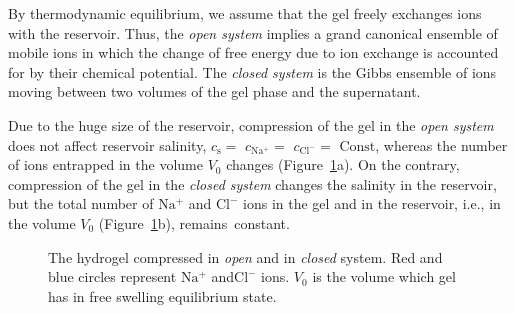 \documentclass[gels,article,accept,pdftex,moreauthors]{Definitions/mdpi}
\newcommand{\ie}{{i.e.,} }
\newcommand{\cna}{c_\mathrm{Na^+}}
\newcommand{\ccl}{c_\mathrm{Cl^-}}
\newcommand{\cl}{\mathrm{Cl^-}}
\newcommand{\na}{\mathrm{Na^+}}
\newcommand{\cs}{c_{\mathrm{s}}}
\newcommand{\Vbox}{V_0}
\newcommand{\reffig}[1]{Figure~\ref{#1}}
\begin{document}
By thermodynamic equilibrium, we assume that the gel freely exchanges ions with the reservoir.
Thus, the \emph{open system} implies a grand canonical ensemble of mobile ions in which the change of free energy due to ion exchange is accounted for by their chemical potential.
The \emph{closed system} is the Gibbs ensemble of ions moving between two volumes of the gel phase and the supernatant.

Due to the huge size of the reservoir, compression of the gel in the \emph{open system} does not affect reservoir salinity, $\cs =$ $\cna=$ $\ccl=$ $\text{Const}$, whereas the number of ions entrapped in the volume $\Vbox$ changes (\reffig{fig:open and closed}a).
On the contrary, compression of the gel in the \emph{closed system} changes the salinity in the reservoir, but the total number of $\na$ and $\cl$ ions in the gel and in the reservoir, \ie in the volume $\Vbox$ (\reffig{fig:open and closed}b), remains~constant.
\begin{figure}[H]
	{\captionsetup{position=bottom,justification=centering}
	}
	
	\caption{The hydrogel compressed in \emph{open} and in \emph{closed} system.
		Red and blue circles represent $\na$ and$\cl$ ions. $V_0$ is the volume which gel has in free swelling equilibrium state.\label{fig:open and closed}}
\end{figure}
\end{document}
